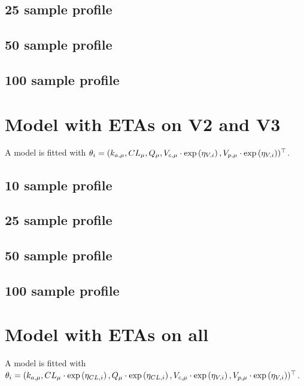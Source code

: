 \subsection{25 sample profile}

\subsection{50 sample profile}

\subsection{100 sample profile}


\section{Model with ETAs on V2 and V3}
A model is fitted with $\theta_i = (k_{a,\mu}, CL_{\mu}, Q_{\mu},V_{c,\mu}\cdot \text{exp}\left({\eta_{V,i}}\right),V_{p,\mu}\cdot \text{exp}\left({\eta_{V,i}}\right))^\top$.

\subsection{10 sample profile}

\subsection{25 sample profile}

\subsection{50 sample profile}

\subsection{100 sample profile}


\section{Model with ETAs on all}
A model is fitted with $\theta_i = (k_{a,\mu}, CL_{\mu}\cdot \text{exp}\left({\eta_{CL,i}}\right), Q_{\mu}\cdot \text{exp}\left({\eta_{CL,i}}\right),V_{c,\mu}\cdot \text{exp}\left({\eta_{V,i}}\right),V_{p,\mu}\cdot \text{exp}\left({\eta_{V,i}}\right))^\top$.

